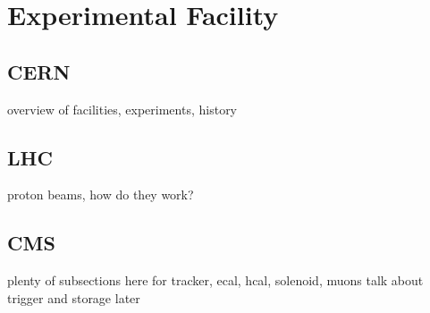 
\chapter{Experimental Facility\label{ch:experiment}}

\section{CERN\label{sec:CERN}}
overview of facilities, experiments, history

\section{LHC\label{sec:LHC}}
proton beams, how do they work?

\section{CMS\label{sec:CMS}}
plenty of subsections here for tracker, ecal, hcal, solenoid, muons
talk about trigger and storage later

